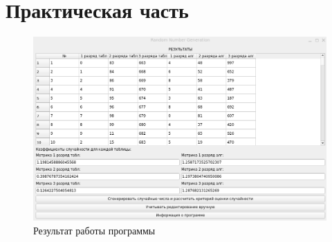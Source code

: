 \chapter{Практическая часть}

\begin{figure}[ht!]
	\centering
	\includegraphics[width=0.8\linewidth]{img/res.png}
	\caption{Результат работы программы}
	\label{ex:int}
\end{figure}

